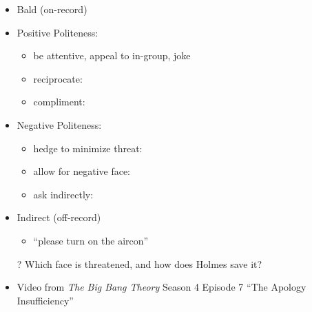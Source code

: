 \documentclass[headrule,footrule]{foils}
\begin{document}
 
  \begin{itemize}\addtolength{\itemsep}{-1ex}
\item Bald (on-record)
\item Positive Politeness: 
  \begin{itemize}
  \item be attentive, appeal to in-group, joke 
  \item reciprocate: 
  \item compliment: 
  \end{itemize}
\item Negative Politeness: 
  \begin{itemize}
  \item hedge to minimize threat: 
  \item allow for negative face: 
  \item ask indirectly: 
  \end{itemize}
\item Indirect (off-record)
  \begin{itemize}
  \item {} ``please turn on the aircon''
  \end{itemize}
\end{itemize}

  \begin{itemize}
  \item[?] Which face is threatened, and how does Holmes save it?
    \\
   \hfill {}\task
\end{itemize}



\MyLogo{}
\begin{itemize}
\item Video from \textit{The Big Bang Theory} Season 4 Episode 7 ``The
  Apology Insufficiency'' %
\end{itemize}
  
\end{document}
